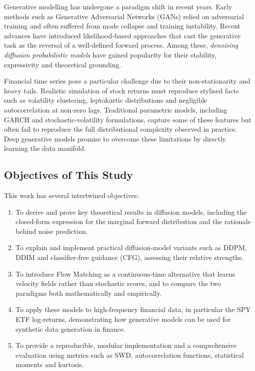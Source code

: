Generative modelling has undergone a paradigm shift in recent
years.  Early methods such as Generative Adversarial Networks (GANs)
relied on adversarial training and often suffered from mode collapse
and training instability.  Recent advances have introduced
likelihood‑based approaches that cast the generative task as the
reversal of a well‑defined forward process.  Among these, \emph{denoising
diffusion probabilistic models} have gained popularity for their
stability, expressivity and theoretical grounding.

Financial time series pose a particular challenge due to their
non‑stationarity and heavy tails.  Realistic simulation of stock
returns must reproduce stylised facts such as volatility clustering,
leptokurtic distributions and negligible autocorrelation at non‑zero
lags.  Traditional parametric models, including GARCH and
stochastic‑volatility formulations, capture some of these features but
often fail to reproduce the full distributional complexity observed in
practice.  Deep generative models promise to overcome these
limitations by directly learning the data manifold.

\subsection{Objectives of This Study}

This work has several intertwined objectives:

\begin{enumerate}[label=\arabic*., leftmargin=2em]
  \item To derive and prove key theoretical results in diffusion
    models, including the closed‑form expression for the marginal
    forward distribution and the rationale behind noise prediction.
  \item To explain and implement practical diffusion‑model variants
    such as DDPM, DDIM and classifier‑free guidance (CFG), assessing
    their relative strengths.
  \item To introduce Flow Matching as a continuous‑time alternative
    that learns velocity fields rather than stochastic scores, and to
    compare the two paradigms both mathematically and empirically.
  \item To apply these models to high‑frequency financial data, in
    particular the SPY ETF log‑returns, demonstrating how generative
    models can be used for synthetic data generation in finance.
  \item To provide a reproducible, modular implementation and a
    comprehensive evaluation using metrics such as SWD, autocorrelation
    functions, statistical moments and kurtosis.
\end{enumerate}

